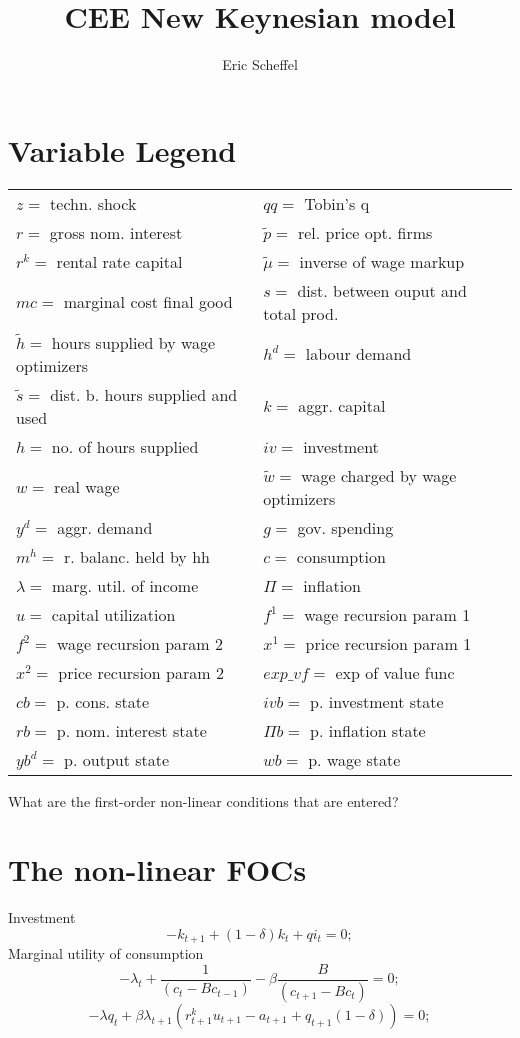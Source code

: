 \documentclass[a4paper,11pt]{article}
\title{CEE New Keynesian model}
\author{Eric Scheffel}
\begin{document}
\maketitle

\section{Variable Legend}

\begin{table}[h]
		\begin{tabular}[c]{l@{\extracolsep{25pt}}l}
			$z=$ techn. shock & $qq=$ Tobin's q \\
			$r=$ gross nom. interest & $\tilde{p}=$ rel. price opt. firms \\
			$r^k=$ rental rate capital & $\tilde{\mu}=$ inverse of wage markup \\
			$mc=$ marginal cost final good & $s=$ dist. between ouput and total prod. \\
			$\tilde{h}=$ hours supplied by wage optimizers & $h^d=$ labour demand \\
			$\tilde{s}=$ dist. b. hours supplied and used & $k=$ aggr. capital \\
			$h=$ no. of hours supplied & $iv=$ investment \\
			$w=$ real wage & $\tilde{w}=$ wage charged by wage optimizers \\
			$y^d=$ aggr. demand & $g=$ gov. spending \\
			$m^h=$ r. balanc. held by hh & $c=$ consumption \\
			$\lambda=$ marg. util. of income & $\Pi=$ inflation \\
			$u=$ capital utilization & $f^1=$ wage recursion param 1 \\
			$f^2=$ wage recursion param 2 & $x^1=$ price recursion param 1 \\
			$x^2=$ price recursion param 2 & $exp\_vf=$ exp of value func \\
			$cb=$ p. cons. state & $ivb=$ p. investment state \\
			$rb=$ p. nom. interest state & $\Pi b=$ p. inflation state \\
			$yb^d=$ p. output state & $wb=$ p. wage state

		\end{tabular}
\end{table}

What are the first-order non-linear conditions that are entered?
\section{The non-linear FOCs}

Investment
\begin{equation}
-k_{t+1}+\left(1-\delta\right)k_t+qi_t=0;
\end{equation}
Marginal utility of consumption
\begin{equation}
-\lambda_t+\frac{1}{\left(c_t-B c_{t-1}\right)}-\beta \frac{B}{\left(c_{t+1}-B c_t\right)}=0;
\end{equation}
\begin{equation}
-\lambda q_t+\beta \lambda_{t+1}\left(r_{t+1}^k u_{t+1}-a_{t+1}+q_{t+1}\left(1-\delta\right)\right)=0;
\end{equation}
\end{document}
